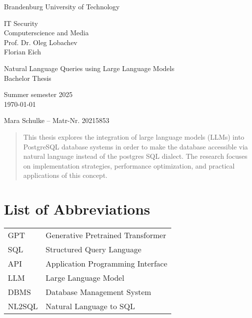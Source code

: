 \documentclass{article}
\begin{document}
\begin{titlepage}
    \begin{center}
        \begin{Large}
            Brandenburg University of Technology \\[1em]
        \end{Large}
        IT Security \\
        Computerscience and Media \\
        Prof. Dr. Oleg Lobachev \\
        Florian Eich
    \end{center}

    \vfill

    \begin{center}
        \Large{Natural Language Queries using Large Language Models}\\[0.5em]
        \large{Bachelor Thesis}\\[1em]
        
        \begin{normalsize}
            Summer semester 2025\\[0.25em]
            \today
        \end{normalsize}
    \end{center}

    \vfill

    \begin{center}
        Mara Schulke – Matr-Nr. 20215853
    \end{center}
\end{titlepage}

\begin{abstract}
This thesis explores the integration of large language models (LLMs) into PostgreSQL database systems in order
to make the database accessible via natural language instead of the postgres SQL dialect. The research focuses
on implementation strategies, performance optimization, and practical applications of this concept.
\end{abstract}

\tableofcontents

\listoffigures

\section*{List of Abbreviations}
\begin{tabular}{ll}
GPT & Generative Pretrained Transformer \\
SQL & Structured Query Language \\
API & Application Programming Interface \\
LLM & Large Language Model \\
DBMS & Database Management System \\
NL2SQL & Natural Language to SQL \\
\end{tabular}
\end{document}
